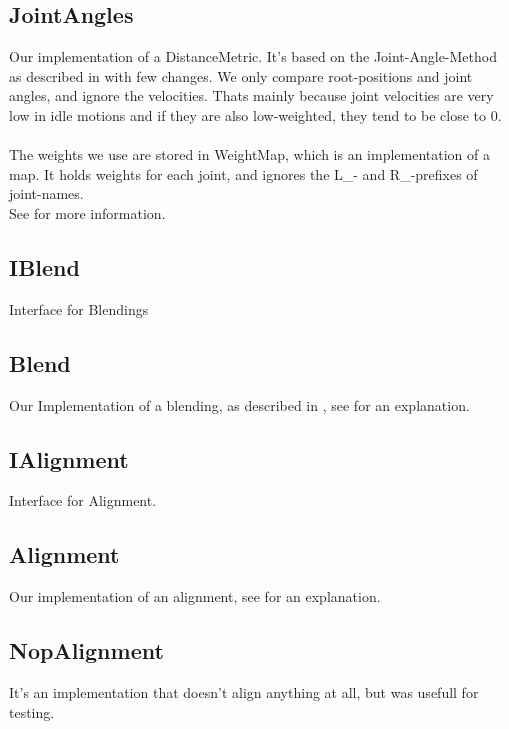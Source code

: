 \documentclass[a4paper,10pt,titlepage,bibliography=totocnumbered]{scrartcl}
\begin{document}
\subsection{JointAngles}
\label{sec:jointangles}
Our implementation of a DistanceMetric. It's based on the Joint-Angle-Method as described in \cite[4.1 Joint angles]{vanbasten2009} with few changes.
We only compare root-positions and joint angles, and ignore the velocities. Thats mainly because joint velocities are very low in idle motions and if they are also low-weighted, they tend to be close to 0.
\\\\
The weights we use are stored in WeightMap, which is an implementation of a map. It holds weights for each joint, and ignores the L\_- and R\_-prefixes of joint-names.
\\
See  for more information.

\subsection{IBlend}

Interface for Blendings

\subsection{Blend}

Our Implementation of a blending, as described in \cite[3.3 Creating Transitions]{kovar2012}, see   for an explanation.

\subsection{IAlignment}

Interface for Alignment.

\subsection{Alignment}

Our implementation of an alignment, see  for an explanation.

\subsection{NopAlignment}

It's an implementation that doesn't align anything at all, but was usefull for testing.
\end{document}
